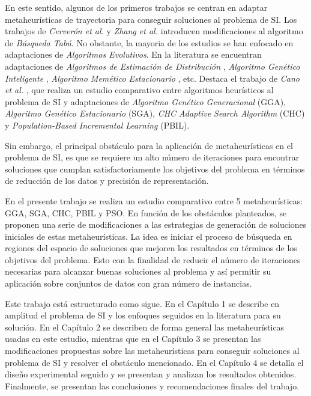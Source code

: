 En este sentido, algunos de los primeros trabajos se centran en adaptar metaheurísticas de trayectoria para conseguir soluciones al problema de SI. Los trabajos de \emph{Cerverón et al.} \cite{cerveron2001another} y \emph{Zhang et al.} \cite{zhang2002optimal} introducen modificaciones al algoritmo de \emph{Búsqueda Tabú}. No obstante, la mayoria de los estudios se han enfocado en adaptaciones de \emph{Algoritmos Evolutivos}. En la literatura se encuentran adaptaciones de \emph{Algoritmos de Estimación de Distribución} \cite{sierra2001prototype}, \emph{Algoritmo Genético Inteligente} \cite{ho2002design}, \emph{Algoritmo Memético Estacionario} \cite{garcia2008memetic}, etc. Destaca el trabajo de \emph{Cano et al.} \cite{cano2003using}, que realiza un estudio comparativo entre algoritmos heurísticos al problema de SI y adaptaciones de \emph{Algoritmo Genético Generacional} (GGA), \emph{Algoritmo Genético Estacionario} (SGA), \emph{CHC Adaptive Search Algorithm} (CHC) y \emph{Population-Based Incremental Learning} (PBIL).

Sin embargo, el principal obstáculo para la aplicación de metaheurísticas en el problema de SI, es que se requiere un alto número de iteraciones para encontrar soluciones que cumplan satisfactoriamente los objetivos del problema en términos de reducción de los datos y precisión de representación.

En el presente trabajo se realiza un estudio comparativo entre 5 metaheurísticas: GGA, SGA, CHC, PBIL y PSO. En función de los obstáculos planteados, se proponen una serie de modificaciones a las estrategias de generación de soluciones iniciales de estas metaheurísticas. La idea es iniciar el proceso de búsqueda en regiones del espacio de soluciones que mejoren los resultados en términos de los objetivos del problema. Esto con la finalidad de reducir el número de iteraciones necesarias para alcanzar buenas soluciones al problema y así permitir su aplicación sobre conjuntos de datos con gran número de instancias.

Este trabajo está estructurado como sigue. En el Capítulo 1 se describe en amplitud el problema de SI y los enfoques seguidos en la literatura para su solución. En el Capítulo 2 se describen de forma general las metaheurísticas usadas en este estudio, mientras que en el Capítulo 3 se presentan las modificaciones propuestas sobre las metaheurísticas para conseguir soluciones al problema de SI y resolver el obstáculo mencionado. En el Capítulo 4 se detalla el diseño experimental seguido y se presentan y analizan los resultados obtenidos. Finalmente, se presentan las conclusiones y recomendaciones finales del trabajo.
